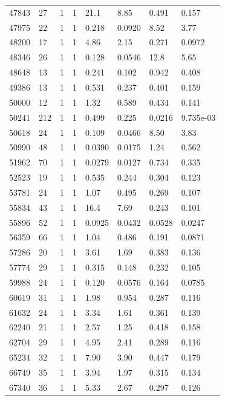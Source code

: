 \documentclass[preview]{standalone}
\begin{document}
{{{{{{{{{{{{{{\begin{tabular}{L{1.2cm}C{1.2cm} C{0.3cm}C{0.5cm} C{1.4cm}C{1.4cm} C{1.4cm}C{1.4cm}}
  47843  &    27  & 1     &  1 &  21.1  & 8.85  & 0.491 &  0.157   \\ 
  47975  &    22  & 1     &  1 &  0.218  & 0.0920  & 8.52 &  3.77   \\ 
  48200  &    17  & 1     &  1 &  4.86  & 2.15  & 0.271 &  0.0972   \\ 
  48346  &    26  & 1     &  1 &  0.128  & 0.0546  & 12.8 &  5.65   \\ 
  48648  &    13  & 1     &  1 &  0.241  & 0.102  & 0.942 &  0.408   \\ 
  49386  &    13  & 1     &  1 &  0.531  & 0.237  & 0.401 &  0.159   \\ 
  50000  &    12  & 1     &  1 &  1.32  & 0.589  & 0.434 &  0.141   \\ 
  50241  &   212  & 1     &  1 &  0.499  & 0.225  & 0.0216 &  9.735e-03   \\ 
  50618  &    24  & 1     &  1 &  0.109  & 0.0466  & 8.50 &  3.83   \\ 
  50990  &    48  & 1     &  1 &  0.0390  & 0.0175  & 1.24 &  0.562   \\ 
  51962  &    70  & 1     &  1 &  0.0279  & 0.0127  & 0.734 &  0.335   \\ 
  52523  &    19  & 1     &  1 &  0.535  & 0.244  & 0.304 &  0.123   \\ 
  53781  &    24  & 1     &  1 &  1.07  & 0.495  & 0.269 &  0.107   \\ 
  55834  &    43  & 1     &  1 &  16.4  & 7.69  & 0.243 &  0.101   \\ 
  55896  &    52  & 1     &  1 &  0.0925  & 0.0432  & 0.0528 &  0.0247   \\ 
  56359  &    66  & 1     &  1 &  1.04  & 0.486  & 0.191 &  0.0871   \\ 
  57286  &    20  & 1     &  1 &  3.61  & 1.69  & 0.383 &  0.136   \\ 
  57774  &    29  & 1     &  1 &  0.315  & 0.148  & 0.232 &  0.105   \\ 
  59988  &    24  & 1     &  1 &  0.120  & 0.0576  & 0.164 &  0.0785   \\ 
  60619  &    31  & 1     &  1 &  1.98  & 0.954  & 0.287 &  0.116   \\ 
  61632  &    24  & 1     &  1 &  3.34  & 1.61  & 0.361 &  0.139   \\ 
  62240  &    21  & 1     &  1 &  2.57  & 1.25  & 0.418 &  0.158   \\ 
  62704  &    29  & 1     &  1 &  4.95  & 2.41  & 0.289 &  0.116   \\ 
  65234  &    32  & 1     &  1 &  7.90  & 3.90  & 0.447 &  0.179   \\ 
  66749  &    35  & 1     &  1 &  3.94  & 1.97  & 0.315 &  0.134   \\ 
  67340  &    36  & 1     &  1 &  5.33  & 2.67  & 0.297 &  0.126   \\ 
\hline 
\end{tabular} 

}}}}}}}}}}}}}}
\end{document}
